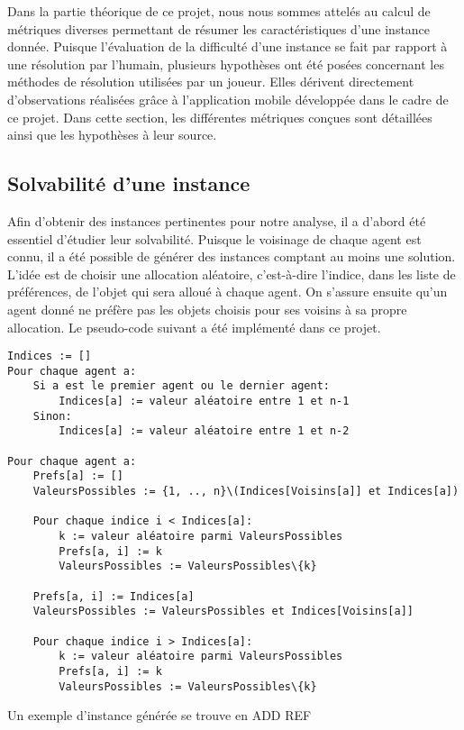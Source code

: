 \documentclass[a4paper, 10pt]{article}
\begin{document}
	Dans la partie théorique de ce projet, nous nous sommes attelés au calcul de métriques diverses permettant de résumer les caractéristiques d'une instance donnée. Puisque l'évaluation de la difficulté d'une instance se fait par rapport à une résolution par l'humain, plusieurs hypothèses ont été posées concernant les méthodes de résolution utilisées par un joueur. Elles dérivent directement d'observations réalisées grâce à l'application mobile développée dans le cadre de ce projet. Dans cette section, les différentes métriques conçues sont détaillées ainsi que les hypothèses à leur source.
	
	\subsection{Solvabilité d'une instance}
	Afin d'obtenir des instances pertinentes pour notre analyse, il a d'abord été essentiel d'étudier leur solvabilité. Puisque le voisinage de chaque agent est connu, il a été possible de générer des instances comptant au moins une solution. L'idée est de choisir une allocation aléatoire, c'est-à-dire l'indice, dans les liste de préférences, de l'objet qui sera alloué à chaque agent. On s'assure ensuite qu'un agent donné ne préfère pas les objets choisis pour ses voisins à sa propre allocation. Le pseudo-code suivant a été implémenté dans ce projet. 

\begin{lstlisting}
Indices := []
Pour chaque agent a:
    Si a est le premier agent ou le dernier agent:
        Indices[a] := valeur aléatoire entre 1 et n-1
    Sinon:
        Indices[a] := valeur aléatoire entre 1 et n-2

Pour chaque agent a:
    Prefs[a] := []
    ValeursPossibles := {1, .., n}\(Indices[Voisins[a]] et Indices[a])
    
    Pour chaque indice i < Indices[a]:
        k := valeur aléatoire parmi ValeursPossibles
        Prefs[a, i] := k
        ValeursPossibles := ValeursPossibles\{k}
        
    Prefs[a, i] := Indices[a]
    ValeursPossibles := ValeursPossibles et Indices[Voisins[a]]
    
    Pour chaque indice i > Indices[a]:
        k := valeur aléatoire parmi ValeursPossibles
        Prefs[a, i] := k
        ValeursPossibles := ValeursPossibles\{k}
\end{lstlisting}
Un exemple d'instance générée se trouve en ADD REF
	
\end{document}
